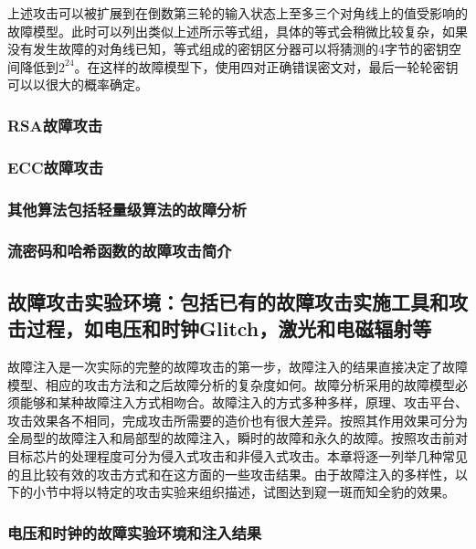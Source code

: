 \documentclass[a4paper,12pt]{article}
\begin{document}
\begin{CJK}{UTF8}{gkai}
上述攻击可以被扩展到在倒数第三轮的输入状态上至多三个对角线上的值受影响的故障模型。此时可以列出类似上述所示等式组，具体的等式会稍微比较复杂，如果没有发生故障的对角线已知，等式组成的密钥区分器可以将猜测的4字节的密钥空间降低到$2^{24}$。在这样的故障模型下，使用四对正确错误密文对，最后一轮轮密钥可以以很大的概率确定。

\subsubsection{RSA故障攻击}
\subsubsection{ECC故障攻击}
\subsubsection{其他算法包括轻量级算法的故障分析}
\subsubsection{流密码和哈希函数的故障攻击简介}

\subsection{故障攻击实验环境：包括已有的故障攻击实施工具和攻击过程，如电压和时钟Glitch，激光和电磁辐射等}
故障注入是一次实际的完整的故障攻击的第一步，故障注入的结果直接决定了故障模型、相应的攻击方法和之后故障分析的复杂度如何。故障分析采用的故障模型必须能够和某种故障注入方式相吻合。故障注入的方式多种多样，原理、攻击平台、攻击效果各不相同，完成攻击所需要的造价也有很大差异。按照其作用效果可分为全局型的故障注入和局部型的故障注入，瞬时的故障和永久的故障。按照攻击前对目标芯片的处理程度可分为侵入式攻击和非侵入式攻击。本章将逐一列举几种常见的且比较有效的攻击方式和在这方面的一些攻击结果。由于故障注入的多样性，以下的小节中将以特定的攻击实验来组织描述，试图达到窥一斑而知全豹的效果。

\subsubsection{电压和时钟的故障实验环境和注入结果}


\end{CJK}
\end{document}
